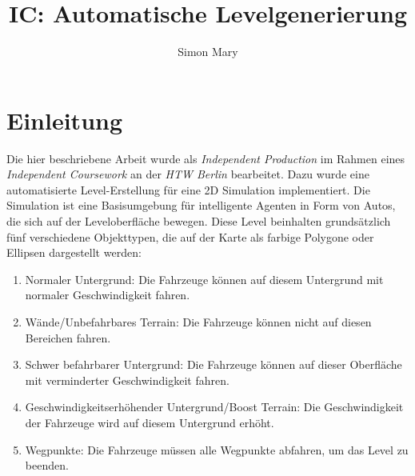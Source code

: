 \documentclass[10pt,a4paper]{article}
\begin{document}


	
	
\title{IC: Automatische Levelgenerierung}
\author{Simon Mary}
\maketitle

\section{Einleitung}
Die hier beschriebene Arbeit wurde als \textit{Independent Production} im Rahmen eines \textit{Independent Coursework} an der \textit{HTW Berlin} bearbeitet. Dazu wurde eine automatisierte Level-Erstellung für eine 2D Simulation implementiert. Die Simulation ist eine Basisumgebung für intelligente Agenten in Form von Autos, die sich auf der Leveloberfläche bewegen. Diese Level beinhalten grundsätzlich fünf verschiedene Objekttypen, die auf der Karte als farbige Polygone oder Ellipsen dargestellt werden: 

\begin{enumerate}
\item{}Normaler Untergrund: Die Fahrzeuge können auf diesem Untergrund mit normaler Geschwindigkeit fahren.
\item{}Wände/Unbefahrbares Terrain: Die Fahrzeuge können nicht auf diesen Bereichen fahren.
\item{}Schwer befahrbarer Untergrund: Die Fahrzeuge können auf dieser Oberfläche mit verminderter Geschwindigkeit fahren.
\item{}Geschwindigkeitserhöhender Untergrund/Boost Terrain: Die Geschwindigkeit der Fahrzeuge wird auf diesem Untergrund erhöht.
\item{}Wegpunkte: Die Fahrzeuge müssen alle Wegpunkte abfahren, um das Level zu beenden.
\end{enumerate}
\end{document}
